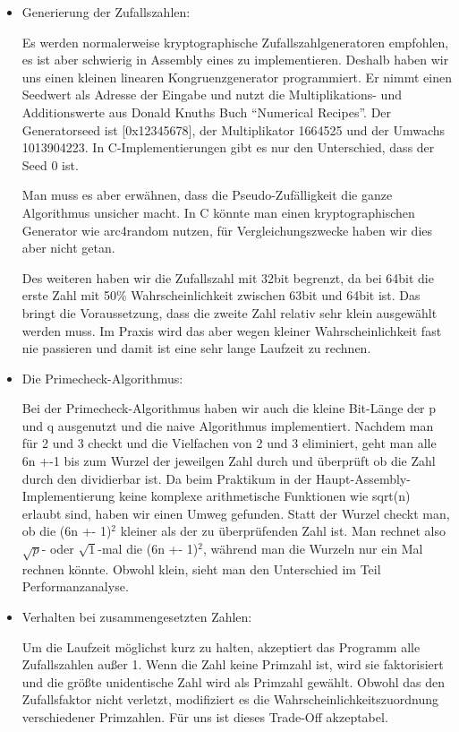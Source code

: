 \documentclass[course=asp]{aspdoc}
\begin{document}
\begin{itemize}
\item 
Generierung der Zufallszahlen:

Es werden normalerweise kryptographische Zufallszahlgeneratoren empfohlen, es ist aber schwierig in Assembly eines zu implementieren. Deshalb haben wir uns einen kleinen linearen Kongruenzgenerator programmiert. Er nimmt einen Seedwert als Adresse der Eingabe und nutzt die Multiplikations- und Additionswerte aus Donald Knuths Buch “Numerical Recipes”. Der Generatorseed ist [0x12345678], der Multiplikator 1664525 und der Umwachs 1013904223. In C-Implementierungen gibt es nur den Unterschied, dass der Seed 0 ist.

Man muss es aber erwähnen, dass die Pseudo-Zufälligkeit die ganze Algorithmus unsicher macht. In C könnte man einen kryptographischen Generator wie arc4random nutzen, für Vergleichungszwecke haben wir dies aber nicht getan.

Des weiteren haben wir die Zufallszahl mit 32bit begrenzt, da bei 64bit die erste Zahl mit 50\% Wahrscheinlichkeit zwischen 63bit und 64bit ist. Das bringt die Voraussetzung, dass die zweite Zahl relativ sehr klein ausgewählt werden muss. Im Praxis wird das aber wegen kleiner Wahrscheinlichkeit fast nie passieren und damit ist eine sehr lange Laufzeit zu rechnen.

\item 
Die Primecheck-Algorithmus:

Bei der Primecheck-Algorithmus haben wir auch die kleine Bit-Länge der p und q ausgenutzt und die naive Algorithmus implementiert. Nachdem man für 2 und 3 checkt und die Vielfachen von 2 und 3 eliminiert, geht man alle 6n +-1 bis zum Wurzel der jeweilgen Zahl durch und überprüft ob die Zahl durch den dividierbar ist. Da beim Praktikum in der Haupt-Assembly-Implementierung keine komplexe arithmetische Funktionen wie sqrt(n) erlaubt sind, haben wir einen Umweg gefunden. Statt der Wurzel checkt man, ob die (6n +- 1)$^{2}$ kleiner als der zu überprüfenden Zahl ist. Man rechnet also $\sqrt{p}$- oder $\sqrt{1}$-mal die (6n +- 1)$^{2}$, während man die Wurzeln nur ein Mal rechnen könnte. Obwohl klein, sieht man den Unterschied im Teil Performanzanalyse.

\item 
Verhalten bei zusammengesetzten Zahlen:
	
Um die Laufzeit möglichst kurz zu halten, akzeptiert das Programm alle Zufallszahlen außer 1. Wenn die Zahl keine Primzahl ist, wird sie faktorisiert und die größte unidentische Zahl wird als Primzahl gewählt. Obwohl das den Zufallsfaktor nicht verletzt, modifiziert es die Wahrscheinlichkeitszuordnung verschiedener Primzahlen. Für uns ist dieses Trade-Off akzeptabel.
\end{itemize}
\end{document}
